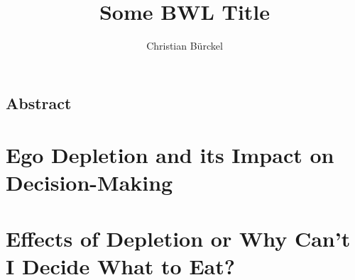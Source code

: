 
\author{Christian Bürckel}
\title{Some BWL Title}




\maketitle
%
 \thispagestyle{plain} %
 \clearpage
 \thispagestyle{empty}
 \mbox{}
 \clearpage
 \pagestyle{bib} %
 \tableofcontents
 \clearpage
 \pagestyle{abstract}
 \section*{Abstract}
  
 \clearpage
 \pagestyle{main}
 \chapter{Ego Depletion and its Impact on Decision-Making}
  
 \chapter{Effects of Depletion or Why Can't I Decide What to Eat?}
  
%
\clearpage
\pagestyle{bib}
%
%

